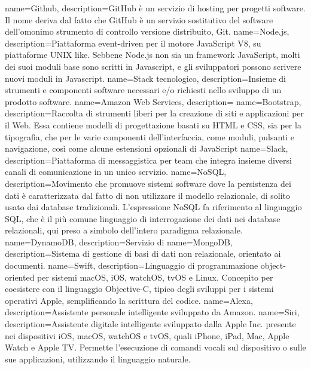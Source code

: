  {
	name=Github,
	description={GitHub è un servizio di hosting per progetti software. Il nome deriva dal fatto che GitHub è un servizio sostitutivo del software dell'omonimo strumento di controllo versione distribuito, Git.}
}
 {
	name=Node.js,
	description={Piattaforma event-driven per il motore JavaScript V8, su piattaforme UNIX like. Sebbene Node.js non sia un framework JavaScript, molti dei suoi moduli base sono scritti in Javascript, e gli sviluppatori possono scrivere nuovi moduli in Javascript.}
}
 {
	name=Stack tecnologico,
	description={Insieme di strumenti e componenti software necessari e/o richiesti nello sviluppo di un prodotto software.}
}
 {
	name=Amazon Web Services,
	description={}
}
 {
	name=Bootstrap,
	description={Raccolta di strumenti liberi per la creazione di siti e applicazioni per il Web. Essa contiene modelli di progettazione basati su HTML e CSS, sia per la tipografia, che per le varie componenti dell'interfaccia, come moduli, pulsanti e navigazione, così come alcune estensioni opzionali di JavaScript}
}
 {
	name=Slack,
	description={Piattaforma di messaggistica per team che integra insieme diversi canali di comunicazione in un unico servizio.}
}
 {
	name=NoSQL,
	description={Movimento che promuove sistemi software dove la persistenza dei dati è caratterizzata dal fatto di non utilizzare il modello relazionale, di solito usato dai database tradizionali. L'espressione NoSQL fa riferimento al linguaggio SQL, che è il più comune linguaggio di interrogazione dei dati nei database relazionali, qui preso a simbolo dell'intero paradigma relazionale.}
}
 {
	name=DynamoDB,
	description={Servizio di}
}
 {
	name=MongoDB,
	description={Sistema di gestione di basi di dati non relazionale, orientato ai documenti.}
}
 {
	name=Swift,
	description={Linguaggio di programmazione object-oriented per sistemi macOS, iOS, watchOS, tvOS e Linux. Concepito per coesistere con il linguaggio Objective-C, tipico degli sviluppi per i sistemi operativi Apple, semplificando la scrittura del codice.}
}
 {
	name=Alexa,
	description={Assistente personale intelligente sviluppato da Amazon.}
}
 {
	name=Siri,
	description={Assistente digitale intelligente sviluppato dalla Apple Inc. presente nei dispositivi iOS, macOS, watchOS e tvOS, quali iPhone, iPad, Mac, Apple Watch e Apple TV. Permette l'esecuzione di comandi vocali sul dispositivo o sulle sue applicazioni, utilizzando il linguaggio naturale.}
}
